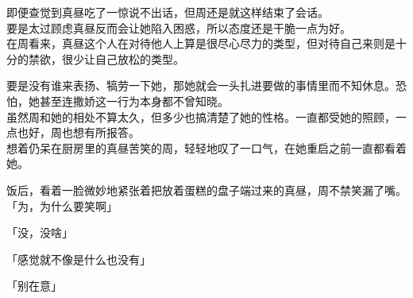即便查觉到真昼吃了一惊说不出话，但周还是就这样结束了会话。\\

要是太过顾虑真昼反而会让她陷入困惑，所以态度还是干脆一点为好。\\

在周看来，真昼这个人在对待他人上算是很尽心尽力的类型，但对待自己来则是十分的禁欲，很少让自己放松的类型。

要是没有谁来表扬、犒劳一下她，那她就会一头扎进要做的事情里而不知休息。恐怕，她甚至连撒娇这一行为本身都不曾知晓。\\

虽然周和她的相处不算太久，但多少也搞清楚了她的性格。一直都受她的照顾，一点也好，周也想有所报答。\\

想着仍呆在厨房里的真昼苦笑的周，轻轻地叹了一口气，在她重启之前一直都看着她。\\

\vspace{2\baselineskip}

饭后，看着一脸微妙地紧张着把放着蛋糕的盘子端过来的真昼，周不禁笑漏了嘴。\\

「为，为什么要笑啊」

「没，没啥」

「感觉就不像是什么也没有」

「别在意」\\

